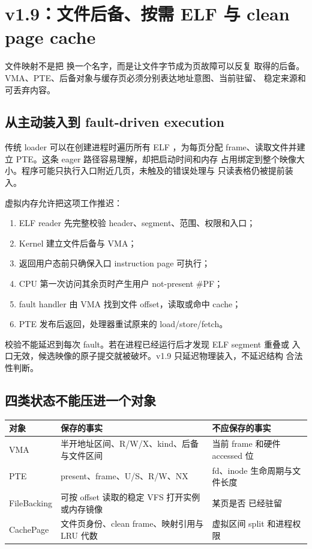 \section{v1.9：文件后备、按需 ELF 与 clean page cache}

\begin{keyidea}
文件映射不是把  换一个名字，而是让文件字节成为页故障可以反复
取得的后备。VMA、PTE、后备对象与缓存页必须分别表达地址意图、当前驻留、
稳定来源和可丢弃内容。
\end{keyidea}

\subsection{从主动装入到 fault-driven execution}

传统 loader 可以在创建进程时遍历所有 ELF ，为每页分配
frame、读取文件并建立 PTE。这条 eager 路径容易理解，却把启动时间和内存
占用绑定到整个映像大小。程序可能只执行入口附近几页，未触及的错误处理与
只读表格仍被提前装入。

虚拟内存允许把这项工作推迟：

\begin{enumerate}[label=\arabic*.]
  \item ELF reader 先完整校验 header、segment、范围、权限和入口；
  \item Kernel 建立文件后备与  VMA；
  \item 返回用户态前只确保入口 instruction page 可执行；
  \item CPU 第一次访问其余页时产生用户 not-present \#PF；
  \item fault handler 由 VMA 找到文件 offset，读取或命中 cache；
  \item PTE 发布后返回，处理器重试原来的 load/store/fetch。
\end{enumerate}

校验不能延迟到每次 fault。若在进程已经运行后才发现 ELF segment 重叠或
入口无效，候选映像的原子提交就被破坏。v1.9 只延迟物理装入，不延迟结构
合法性判断。

\subsection{四类状态不能压进一个对象}

\begin{longtable}{L{0.20\textwidth}L{0.31\textwidth}L{0.33\textwidth}}
\toprule
\textbf{对象} & \textbf{保存的事实} & \textbf{不应保存的事实}\\
\midrule
VMA & 半开地址区间、R/W/X、kind、后备与文件区间 & 当前 frame 和硬件
accessed 位\\
PTE & present、frame、U/S、R/W、NX & fd、inode 生命周期与文件长度\\
FileBacking & 可按 offset 读取的稳定 VFS 打开实例或内存镜像 & 某页是否
已经驻留\\
CachePage & 文件页身份、clean frame、映射引用与 LRU 代数 & 虚拟区间
split 和进程权限\\
\bottomrule
\end{longtable}

